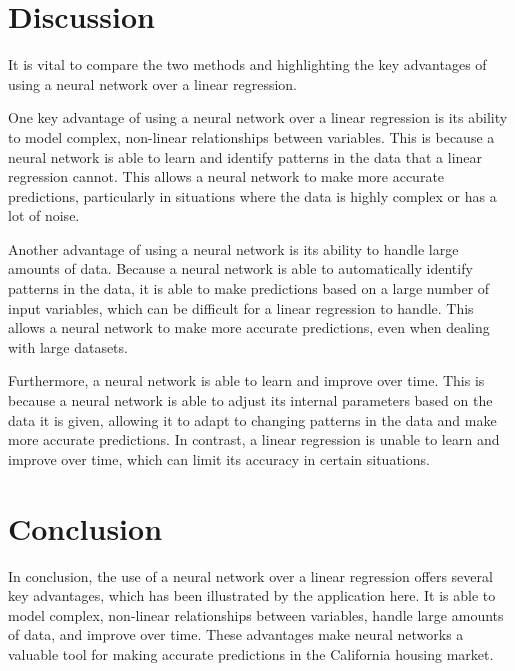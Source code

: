 \documentclass[11pt]{article}
\begin{document}
\section{Discussion}
It is vital to compare the two methods and highlighting the key advantages of using a neural network over a linear regression.

One key advantage of using a neural network over a linear regression is its ability to model complex, non-linear relationships between variables. This is because a neural network is able to learn and identify patterns in the data that a linear regression cannot. This allows a neural network to make more accurate predictions, particularly in situations where the data is highly complex or has a lot of noise.

Another advantage of using a neural network is its ability to handle large amounts of data. Because a neural network is able to automatically identify patterns in the data, it is able to make predictions based on a large number of input variables, which can be difficult for a linear regression to handle. This allows a neural network to make more accurate predictions, even when dealing with large datasets.

Furthermore, a neural network is able to learn and improve over time. This is because a neural network is able to adjust its internal parameters based on the data it is given, allowing it to adapt to changing patterns in the data and make more accurate predictions. In contrast, a linear regression is unable to learn and improve over time, which can limit its accuracy in certain situations.


\section{Conclusion}
In conclusion, the use of a neural network over a linear regression offers several key advantages, which has been illustrated by the application here. It is able to model complex, non-linear relationships between variables, handle large amounts of data, and improve over time. These advantages make neural networks a valuable tool for making accurate predictions in the California housing market.


\appendix
\end{document}
